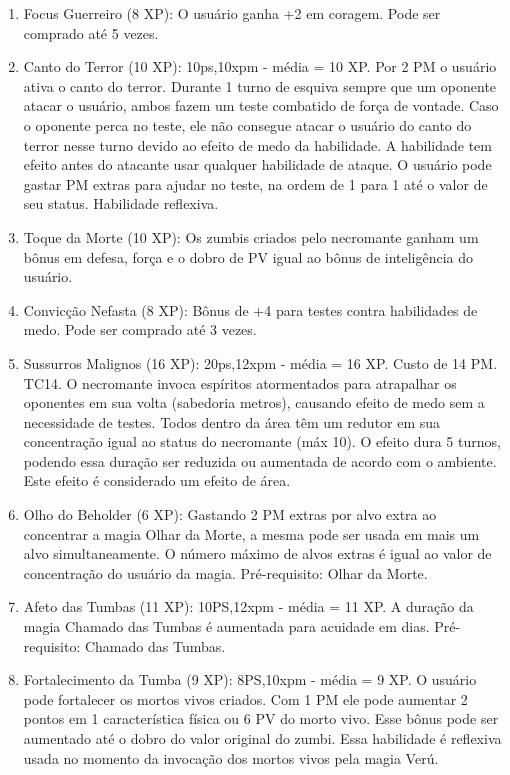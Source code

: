   
\begin{enumerate}

 	\item Focus Guerreiro (8 XP): O usuário ganha +2 em coragem. Pode ser comprado até 5 vezes.

	\item Canto do Terror (10 XP): 10ps,10xpm - média = 10 XP. Por 2 PM o usuário ativa o canto do terror. Durante 1 turno de esquiva sempre que um oponente atacar o usuário, ambos fazem um teste combatido de força de vontade. Caso o oponente perca no teste, ele não consegue atacar o usuário do canto do terror nesse turno devido ao efeito de medo da habilidade. A habilidade tem efeito antes do atacante usar qualquer habilidade de ataque. O usuário pode gastar PM extras para ajudar no teste, na ordem de 1 para 1 até o valor de seu status. Habilidade reflexiva.
			
  \item Toque da Morte (10 XP): Os zumbis criados pelo necromante ganham um bônus em defesa, força e o dobro de PV igual ao bônus de inteligência do usuário. 

	\item Convicção Nefasta (8 XP): Bônus de +4 para testes contra habilidades de medo. Pode ser comprado até 3 vezes.
 
  \item Sussurros Malignos (16 XP): 20ps,12xpm - média = 16 XP. Custo de 14 PM. TC14.\newline 
  O necromante invoca espíritos atormentados para atrapalhar os oponentes em sua volta (sabedoria metros), causando efeito de medo sem a necessidade de testes. Todos dentro da área têm um redutor em sua concentração igual ao status do necromante (máx 10). O efeito dura 5 turnos, podendo essa duração ser reduzida ou aumentada de acordo com o ambiente. Este efeito é considerado um efeito de área.

	\item Olho do Beholder (6 XP): Gastando 2 PM extras por alvo extra ao concentrar a magia Olhar da Morte, a mesma pode ser usada em mais um alvo simultaneamente. O número máximo de alvos extras é igual ao valor de concentração do usuário da magia. Pré-requisito: Olhar da Morte.

	\item Afeto das Tumbas (11 XP): 10PS,12xpm - média = 11 XP. A duração da magia Chamado das Tumbas é aumentada para acuidade em dias. Pré-requisito: Chamado das Tumbas. 
	
	\item Fortalecimento da Tumba (9 XP): 8PS,10xpm - média = 9 XP. O usuário pode fortalecer os mortos vivos criados. Com 1 PM ele pode aumentar 2 pontos em 1 característica física ou 6 PV do morto vivo. Esse bônus pode ser aumentado até o dobro do valor original do zumbi. Essa habilidade é reflexiva usada no momento da invocação dos mortos vivos pela magia Verú.
	

\end{enumerate}
